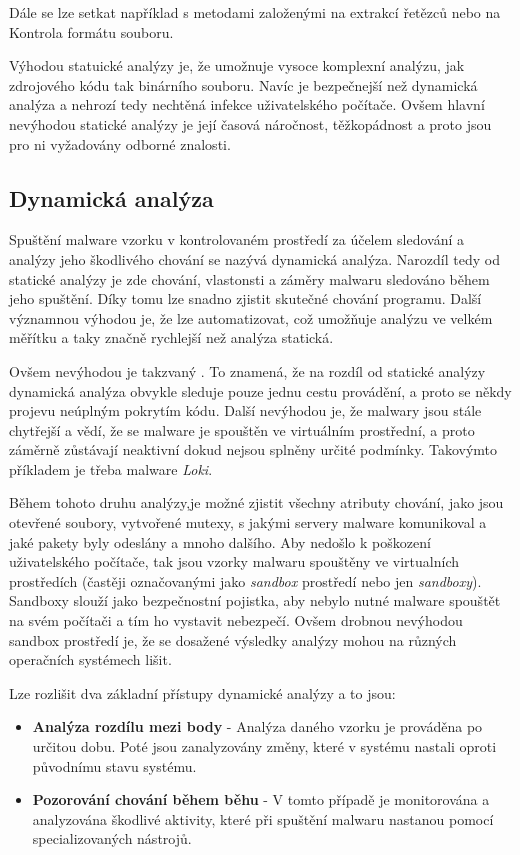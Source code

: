 Dále se lze setkat například s metodami založenými na extrakcí řetězců nebo na Kontrola formátu souboru.

Výhodou statuické analýzy je, že umožnuje vysoce komplexní analýzu, jak zdrojového kódu tak binárního souboru. Navíc je bezpečnejší než dynamická analýza a nehrozí tedy nechtěná infekce uživatelského počítače.
Ovšem hlavní nevýhodou statické analýzy je její časová náročnost, těžkopádnost a proto jsou pro ni vyžadovány odborné znalosti.

\newpage
\subsection*{Dynamická analýza} \label{dynamic}
Spuštění malware vzorku v kontrolovaném prostředí za účelem sledování a analýzy jeho škodlivého chování se nazývá dynamická analýza.
Narozdíl tedy od statické analýzy je zde chování, vlastonsti a záměry malwaru sledováno během jeho spuštění.
Díky tomu lze snadno zjistit skutečné chování programu. Další významnou výhodou je, že lze automatizovat, což umožňuje analýzu ve velkém měřítku a taky značně rychlejší než analýza statická.

Ovšem nevýhodou je takzvaný . To znamená, že na rozdíl od statické analýzy dynamická analýza obvykle sleduje pouze jednu cestu provádění, a proto se někdy projevu
neúplným pokrytím kódu. Další nevýhodou je, že malwary jsou stále chytřejší a vědí, že se malware je spouštěn ve virtuálním prostřední, a proto záměrně zůstávají neaktivní dokud nejsou splněny určité podmínky. Takovýmto příkladem je třeba malware \textit{Loki}.

Během tohoto druhu analýzy,je možné zjistit všechny atributy chování, jako jsou otevřené soubory, vytvořené mutexy, s jakými servery malware komunikoval a jaké pakety byly odeslány a mnoho dalšího.
Aby nedošlo k poškození uživatelského počítače, tak jsou vzorky malwaru spouštěny ve virtualních prostředích (častěji označovanými jako \textit{sandbox} prostředí nebo jen \textit{sandboxy}). Sandboxy slouží jako bezpečnostní pojistka, aby
nebylo nutné malware spouštět na svém počítači a tím ho vystavit nebezpečí. Ovšem drobnou nevýhodou sandbox prostředí je, že se dosažené výsledky analýzy mohou na různých operačních systémech lišit.

Lze rozlišit dva základní přístupy dynamické analýzy a to jsou:
\begin{itemize}
    \item \textbf{Analýza rozdílu mezi body} - Analýza daného vzorku je prováděna po určitou dobu. Poté jsou zanalyzovány změny, které v systému nastali oproti původnímu stavu systému.
    \item \textbf{Pozorování chování během běhu} - V tomto případě je monitorována a analyzována škodlivé aktivity, které při spuštění malwaru nastanou pomocí specializovaných nástrojů. 
\end{itemize}


